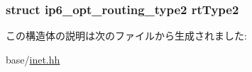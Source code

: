 \label{structNet_1_1ip6__opt__hdr_a18673b2f11c7baba50d70623efe6406f}
\hypertarget{structNet_1_1ip6__opt__hdr_a2f52f6b4de93b55e73dbe318c454a120}{
\subsubsection[{rtType2}]{\setlength{\rightskip}{0pt plus 5cm}struct {\bf ip6\_\-opt\_\-routing\_\-type2} {\bf rtType2}}}
\label{structNet_1_1ip6__opt__hdr_a2f52f6b4de93b55e73dbe318c454a120}


この構造体の説明は次のファイルから生成されました:\begin{DoxyCompactItemize}
\item 
base/\hyperlink{inet_8hh}{inet.hh}\end{DoxyCompactItemize}
